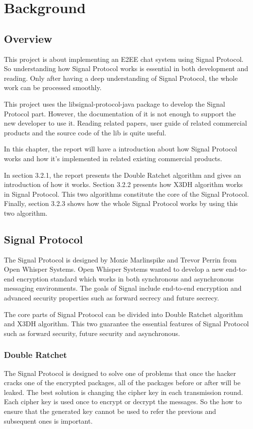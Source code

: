 \section{Background}
\subsection{Overview}
This project is about implementing an E2EE chat system using Signal Protocol. So understanding how Signal Protocol works is essential in both development and reading. Only after having a deep understanding of Signal Protocol, the whole work can be processed smoothly.

This project uses the libsignal-protocol-java package to develop the Signal Protocol part. However, the documentation of it is not enough to support the new developer to use it. Reading related papers, user guide of related commercial products and the source code of the lib is quite useful.

In this chapter, the report will have a introduction about how Signal Protocol works and how it's implemented in related existing commercial products.

In section 3.2.1, the report presents the Double Ratchet algorithm and gives an introduction of how it works. Section 3.2.2 presents how X3DH algorithm works in Signal Protocol. This two algorithms constitute the core of the Signal Protocol. Finally, section 3.2.3 shows how the whole Signal Protocol works by using this two algorithm.

\subsection{Signal Protocol}
The Signal Protocol is designed by Moxie Marlinspike and Trevor Perrin from Open Whisper Systems. Open Whisper Systems wanted to develop
a new end-to-end encryption standard which works in both synchronous and asynchronous messaging environments. The goals of Signal include end-to-end encryption and advanced security properties such as forward secrecy and future secrecy.

The core parts of Signal Protocol can be divided into Double Ratchet algorithm and X3DH algorithm. This two guarantee the essential features of Signal Protocol such as forward security, future security and asynchronous.

\subsubsection{Double Ratchet}
The Signal Protocol is designed to solve one of problems that once the hacker cracks one of the encrypted packages, all of the packages before or after will be leaked. The best solution is changing the cipher key in each transmission round. Each cipher key is used once to encrypt or decrypt the messages. So the how to ensure that the generated key cannot be used to refer the previous and subsequent ones is important.

